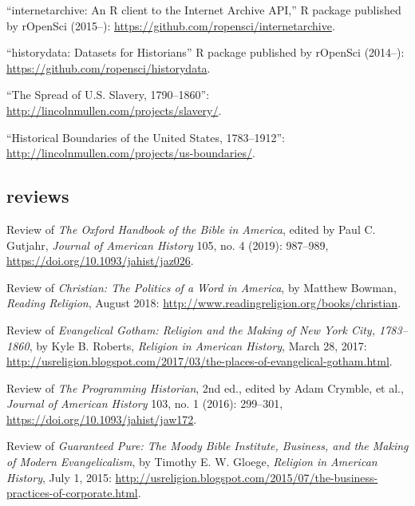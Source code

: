 \documentclass[11pt]{article}
\begin{document}
``internetarchive: An R client to the Internet Archive API,'' R package 
published by rOpenSci (2015--): 
\url{https://github.com/ropensci/internetarchive}.

``historydata: Datasets for Historians'' R package published by rOpenSci 
(2014--):  
\url{https://github.com/ropensci/historydata}.


``The Spread of U.S.  Slavery, 1790--1860'':  
\url{http://lincolnmullen.com/projects/slavery/}.

``Historical Boundaries of the United States, 1783--1912'': 
\url{http://lincolnmullen.com/projects/us-boundaries/}.




\subsection{reviews}\label{book-reviews}

Review of \emph{The Oxford Handbook of the Bible in America}, edited by Paul 
C. Gutjahr, \emph{Journal of American History} 105, no. 4 (2019): 987--989, \url{https://doi.org/10.1093/jahist/jaz026}.

Review of \emph{Christian: The Politics of a Word in America}, by Matthew 
Bowman, \emph{Reading Religion}, August 2018: 
\url{http://www.readingreligion.org/books/christian}.

Review of \emph{Evangelical Gotham: Religion and the Making of New York City, 
  1783--1860}, by Kyle B. Roberts, \emph{Religion in American History}, March 
28, 2017: 
\url{http://usreligion.blogspot.com/2017/03/the-places-of-evangelical-gotham.html}.

Review of \emph{The Programming Historian}, 2nd ed., edited by
Adam Crymble, et al., \emph{Journal of American History} 103, no. 1 (2016): 
299--301, \url{https://doi.org/10.1093/jahist/jaw172}.

Review of \emph{Guaranteed Pure: The Moody Bible Institute, Business, and the 
  Making of Modern Evangelicalism}, by Timothy E. W. Gloege, \emph{Religion in 
  American History}, July 1, 2015: 
  \url{http://usreligion.blogspot.com/2015/07/the-business-practices-of-corporate.html}.
\end{document}
